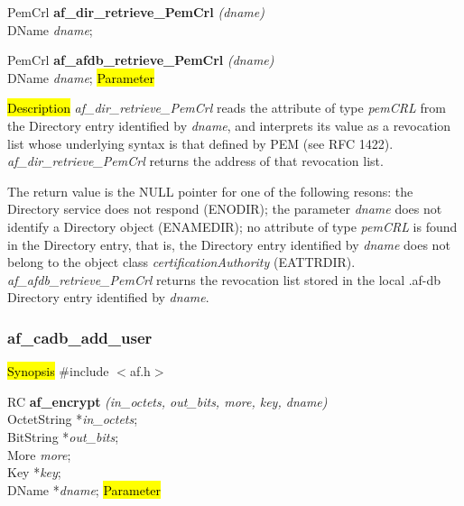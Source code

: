 PemCrl {\bf *af\_dir\_retrieve\_PemCrl} {\em (dname)} \\
DName {\em *dname};

PemCrl {\bf *af\_afdb\_retrieve\_PemCrl} {\em (dname)} \\
DName {\em *dname};
\hl{Parameter}

\hl{Description}
{\em af\_dir\_retrieve\_PemCrl} reads the attribute of type {\em pemCRL} from the Directory entry 
identified by {\em dname}, and interprets its value as a revocation list whose underlying
syntax is that defined by PEM (see RFC 1422).
{\em af\_dir\_retrieve\_PemCrl} returns the address of that revocation list.

The return value is the NULL pointer for one of the following resons:
\bi
\m the Directory service does not respond (ENODIR);
\m the parameter {\em dname} does not identify a Directory object (ENAMEDIR);
\m no attribute of type {\em pemCRL} is found in the Directory entry, that is, the 
Directory entry identified by {\em dname} does not belong to 
the object class {\em certificationAuthority} (EATTRDIR).
\ei
{\em af\_afdb\_retrieve\_PemCrl} returns the revocation list 
stored in the local .af-db Directory entry identified by {\em dname}.



\subsubsection{af\_cadb\_add\_user}
\label{af_encrypt}
\hl{Synopsis}
\#include $<$af.h$>$

RC {\bf af\_encrypt} {\em (in\_octets, out\_bits, more, key, dname)} \\
OctetString *{\em in\_octets}; \\
BitString *{\em out\_bits}; \\
More {\em more}; \\
Key *{\em key}; \\
DName *{\em dname};
\hl{Parameter}


